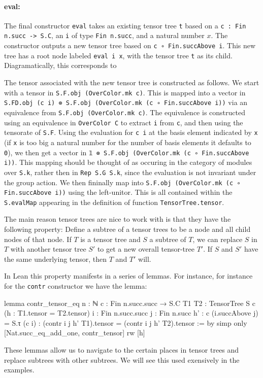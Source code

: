 \documentclass[a4paper, 11pt]{article}
\newcommand{\tensorTree}[1]{
\begin{center}
  \fcolorbox{mycolor}{white}{%
#1}
\end{center}
}
\begin{document}
\paragraph{eval:}
The final constructor \lstinline|eval| takes an existing tensor tree \lstinline|t| based on a \lstinline|c : Fin n.succ -> S.C|,
an \lstinline|i| of type \lstinline|Fin n.succ|, and a natural number $x$.  
The constructor outputs a new tensor tree based on \lstinline|c ∘ Fin.succAbove i|.
This new tree has a root node labeled \lstinline|eval i x|, with the tensor tree \lstinline|t| as its child.
Diagramatically, this corresponds to 
\tensorTree{
  \begin{tikzpicture}
    \node[draw=black] (A) at (0,0) {\lstinline|eval i x|};
    \node (B) at (0,-1) {\lstinline|t|};
    \draw[->] (A) -- (B);
  \end{tikzpicture} 
}
The tensor associated with the new tensor tree is constructed as follows.
We start with a tensor in \lstinline|S.F.obj (OverColor.mk c)|.
This is mapped into a vector in \lstinline|S.FD.obj (c i) ⊗ S.F.obj (OverColor.mk (c ∘ Fin.succAbove i))| via an equivalence from
\lstinline|S.F.obj (OverColor.mk c)|. The equivalence is constructed using an equivalence
in \lstinline|OverColor C| to extract \lstinline|i| from \lstinline|c|, and
then using the tensorate of \lstinline|S.F|.
Using the evaluation for \lstinline|c i| at the basis element indicated by \lstinline|x| (if \lstinline|x| is too big a natural number for the number of basis elements it defaults to \lstinline|0|), we then get a vector in
\lstinline|𝟙 ⊗ S.F.obj (OverColor.mk (c ∘ Fin.succAbove i))|.
This mapping should be thought of as occuring in the  category of modules over \lstinline|S.k|, rather then in 
\lstinline|Rep S.G S.k|, since the evaluation is not invariant under the group action.
We then fininally map  into \lstinline|S.F.obj (OverColor.mk (c ∘ Fin.succAbove i))| 
using the left-unitor. This is all contained within the \lstinline|S.evalMap| appearing in the definition of
function \lstinline|TensorTree.tensor|.

The main reason tensor trees are nice to work with is that they have the following property: 
Define a subtree of a tensor trees 
to be a node and all child nodes of that node. 
If $T$ is a tensor tree and $S$ a subtree of $T$, we can replace $S$ in $T$ 
with another tensor tree $S'$
to get a new overall tensor-tree $T'$. If $S$ and $S'$ have the same underlying tensor, 
then $T$ and $T'$ will. 

In Lean this property manifests in a series of lemmas. For instance, for instance 
for the \lstinline|contr| constructor we have the lemma: 
\begin{code}
lemma contr_tensor_eq {n : ℕ} {c : Fin n.succ.succ → S.C} {T1 T2 : TensorTree S c}
    (h : T1.tensor = T2.tensor) {i : Fin n.succ.succ} {j : Fin n.succ}
    {h' : c (i.succAbove j) = S.τ (c i)} :
    (contr i j h' T1).tensor = (contr i j h' T2).tensor := by
  simp only [Nat.succ_eq_add_one, contr_tensor]
  rw [h]
\end{code}
These lemmas allow us to navigate to the certain places in tensor trees and replace 
subtrees with other subtrees. We will see this used exensively in the examples. 
\end{document}
